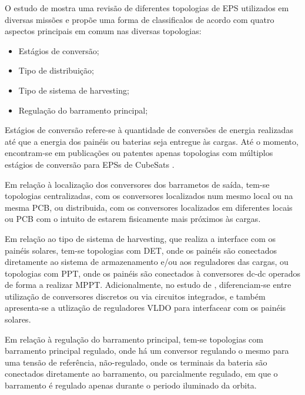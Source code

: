 O estudo de \textcite{comprehensive-review-eps} mostra uma revisão de diferentes topologias de \gls{EPS} utilizados em diversas missões e propõe uma forma de classificalos de acordo com quatro aspectos principais em comum nas diversas topologias:
\begin{itemize}
    \item Estágios de conversão;
    \item Tipo de distribuição; %
    \item Tipo de sistema de harvesting;%
    \item Regulação do barramento principal;%
\end{itemize}

Estágios de conversão refere-se à quantidade de conversões de energia realizadas até que a energia dos painéis ou baterias seja entregue às cargas. Até o momento, encontram-se em publicações ou patentes apenas topologias com múltiplos estágios de conversão para \gls{EPS}s de CubeSats \cite{comprehensive-review-eps}.

Em relação à localização dos conversores dos barrametos de saída, tem-se topologias centralizadas, com os conversores localizados num mesmo local ou na mesma PCB, ou distribuida, com os conversores localizados em diferentes locais ou PCB com o intuito de estarem fisicamente mais próximos às cargas.

Em relação ao tipo de sistema de harvesting, que realiza a interface com os painéis solares, tem-se topologias com \gls{DET}, onde os painéis são conectados diretamente ao sistema de armazenamento e/ou aos reguladores das cargas, ou topologias com \gls{PPT}, onde os painéis são conectados à conversores dc-dc operados de forma a realizar \gls{MPPT}.
Adicionalmente, no estudo de \textcite{sara-review-eps}, diferenciam-se entre utilização de conversores discretos ou via circuitos integrados, e também apresenta-se a utlização de reguladores VLDO para interfacear com os painéis solares.

Em relação à regulação do barramento principal, tem-se topologias com barramento principal regulado, onde há um conversor regulando o mesmo para uma tensão de referência, não-regulado, onde os terminais da bateria são conectados diretamente ao barramento, ou parcialmente regulado, em que o barramento é regulado apenas durante o periodo iluminado da orbita.



